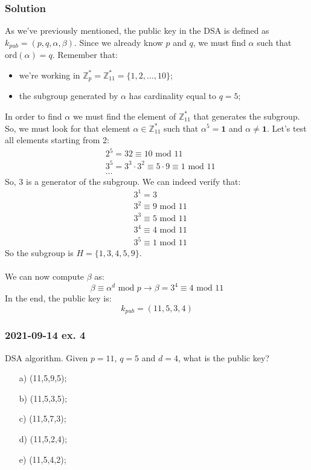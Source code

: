 \documentclass[11pt, a4paper]{article}
\newcommand{\idElement}{
    \textbf{1}
}
\newcommand{\mymod}{
    \text{ mod }
}
\begin{document}
\subsubsection*{Solution}
As we've previously mentioned, the public key in the DSA is defined as $k_{pub}=(p,q,\alpha,\beta)$. Since we already know $p$ and $q$, we must find $\alpha$ such that $\text{ord}(\alpha)=q$. Remember that:
\begin{itemize}
    \item we're working in $\mathbb{Z}_p^*=\mathbb{Z}_{11}^*=\{1,2,...,10\}$;
    \item the subgroup generated by $\alpha$ has cardinality equal to $q=5$;
\end{itemize}
In order to find $\alpha$ we must find the element of $\mathbb{Z}_{11}^*$ that generates the subgroup. So, we must look for that element $\alpha\in \mathbb{Z}_{11}^*$ such that $\alpha^5=\idElement$ and $\alpha\not=\idElement$. Let's test all elements starting from 2:
\begin{align*}
    &2^5=32\equiv10\mymod11\\
    &3^5=3^3\cdot3^2\equiv5\cdot9\equiv1\mymod11\\
    &...
\end{align*}
So, 3 is a generator of the subgroup. We can indeed verify that:
\begin{align*}
    &3^1=3\\
    &3^2\equiv9\mymod11\\
    &3^3\equiv5\mymod11\\
    &3^4\equiv4\mymod11\\
    &3^5\equiv1\mymod11
\end{align*}
So the subgroup is $H=\{1,3,4,5,9\}$.\\\\
We can now compute $\beta$ as:
$$\beta\equiv\alpha^d\mymod p\longrightarrow\beta=3^4\equiv 4\mymod 11$$
In the end, the public key is:
$$k_{pub}=(11,5,3,4)$$

\newpage
\subsubsection{2021-09-14 ex. 4}
DSA algorithm. Given $p=11$, $q=5$ and $d=4$,  what is the public key?
\begin{itemize}
    \item[a)] (11,5,9,5);
    \item[b)] (11,5,3,5);
    \item[c)] (11,5,7,3);
    \item[d)] (11,5,2,4);
    \item[e)] (11,5,4,2);
\end{itemize}
\end{document}
